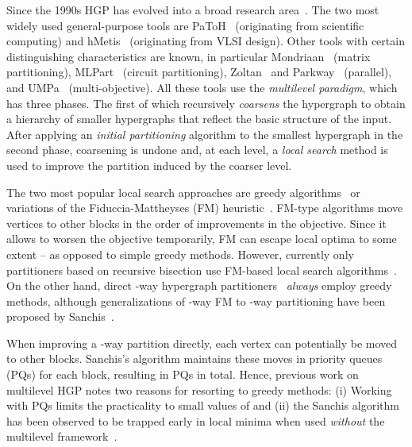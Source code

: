 \documentclass[runningheads,a4paper]{llncs}
\begin{document}
Since the 1990s HGP has evolved into a broad research area~\cite{Alpert19951,DBLP:conf/dimacs/2012,Papa2007}. 
The two most widely used general-purpose tools are PaToH~\cite{PaToH} (originating from scientific computing) 
and hMetis~\cite{hMetisRB,hMetisKway} (originating from VLSI design). 
Other tools with certain distinguishing characteristics are known, in particular Mondriaan~\cite{Mondriaan} (matrix 
partitioning), MLPart~\cite{MLPart} (circuit partitioning), Zoltan~\cite{Zoltan} and Parkway~\cite{Parkway2.0} (parallel), 
and UMPa~\cite{DBLP:conf/dimacs/CatalyurekDKU12} (multi-objective).
All these tools use the \emph{multilevel paradigm}, which  has three phases. The first of which recursively \emph{coarsens} 
the hypergraph to obtain a hierarchy of smaller hypergraphs that reflect the basic structure of the input. After 
applying an \emph{initial partitioning} algorithm to the smallest hypergraph in the second phase, coarsening is 
undone and, at each level, a \emph{local search} method is used to improve the partition induced by the coarser level.

The two most popular local search approaches are greedy algorithms~\cite{hMetisKway,DBLP:conf/dimacs/CatalyurekDKU12} or variations of
the Fiduccia-Mattheyses (FM) heuristic~\cite{FM82}. FM-type algorithms move vertices to other 
blocks in the order of improvements in the objective. Since it allows to worsen the objective temporarily, FM can escape
local optima to some extent -- as opposed to simple greedy methods. However, currently only partitioners based on recursive bisection 
use FM-based local search algorithms~\cite{MLPart,PaToH,Zoltan,hMetisRB,Mondriaan}. On the other hand, direct -way hypergraph 
partitioners~\cite{Aykanat:2008,hMetisKway,Parkway2.0,DBLP:conf/dimacs/CatalyurekDKU12} \emph{always} employ greedy methods, although generalizations of -way FM to -way partitioning have been proposed by Sanchis~\cite{HypergraphKFM}. 

When improving a -way partition directly, each vertex can potentially be moved to  other blocks. Sanchis's algorithm maintains these
moves in  priority queues (PQs) for each block, resulting in  PQs in total.
Hence, previous work on multilevel HGP notes two reasons for resorting to greedy methods: 
(i) Working with  PQs limits the practicality to small values of  and (ii) the Sanchis algorithm has been observed to be trapped early in local minima when used \emph{without} the multilevel framework~\cite{flatKFM,hMetisKway}.
\end{document}
